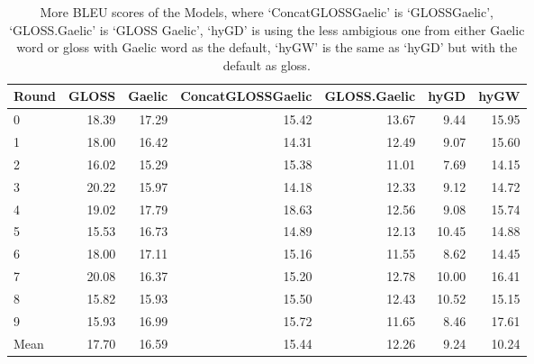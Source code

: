 \documentclass[a4paper]{article}
\begin{document}
\begin{table}[ht]
\centering
\begin{tabular}{lrrrrrr}
  \hline
Round & GLOSS & Gaelic & ConcatGLOSSGaelic & GLOSS.Gaelic & hyGD & hyGW \\ 
  \hline
0 & 18.39 & 17.29 & 15.42 & 13.67 & 9.44 & 15.95 \\ 
  1 & 18.00 & 16.42 & 14.31 & 12.49 & 9.07 & 15.60 \\ 
  2 & 16.02 & 15.29 & 15.38 & 11.01 & 7.69 & 14.15 \\ 
  3 & 20.22 & 15.97 & 14.18 & 12.33 & 9.12 & 14.72 \\ 
  4 & 19.02 & 17.79 & 18.63 & 12.56 & 9.08 & 15.74 \\ 
  5 & 15.53 & 16.73 & 14.89 & 12.13 & 10.45 & 14.88 \\ 
  6 & 18.00 & 17.11 & 15.16 & 11.55 & 8.62 & 14.45 \\ 
  7 & 20.08 & 16.37 & 15.20 & 12.78 & 10.00 & 16.41 \\ 
  8 & 15.82 & 15.93 & 15.50 & 12.43 & 10.52 & 15.15 \\ 
  9 & 15.93 & 16.99 & 15.72 & 11.65 & 8.46 & 17.61 \\ 
   \hline
Mean & 17.70 & 16.59 & 15.44 & 12.26 & 9.24 & 10.24 \\ 
   \hline
\end{tabular}
\caption{More BLEU scores of the Models, where `ConcatGLOSSGaelic' is `GLOSS\textunderscore Gaelic', `GLOSS.Gaelic' is `GLOSS Gaelic', `hyGD' is using the less ambigious one from either Gaelic word or gloss with Gaelic word as the default, `hyGW' is the same as `hyGD' but with the default as gloss.} 
\label{Table:BLEUGlossGDALL}
\end{table}%
\end{document}
